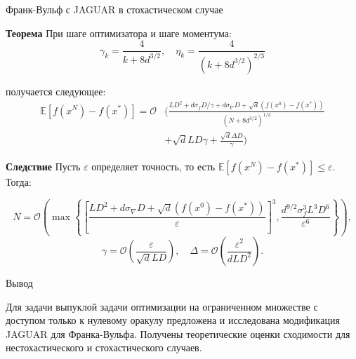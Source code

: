 \documentclass{beamer}
\newcommand{\expect}[1]{\mathbb{E}\left[ #1 \right]}
\begin{document}
\begin{frame}{Франк-Вульф с JAGUAR в стохастическом случае}

    \textbf{Теорема} При шаге оптимизатора и шаге моментума:
        $$\gamma_k = \frac{4}{k + 8d^{3/2}}, \quad \eta_k = \frac{4}{(k + 8d^{3/2})^{2/3}}$$
            
        получается следующее:
        \small{
            \begin{equation*}
                \begin{split}
                    \expect{f(x^{N}) - f(x^*)} = \mathcal{O}
                    &\Bigg(
                    \frac{L D^2 + d \sigma_f D/ \gamma + d \sigma_{\nabla} D + \sqrt{d} (f(x^0) - f(x^*))}{(N + 8d^{3/2})^{1/3}} 
                    \\&+
                    \sqrt{d} L D \gamma + \frac{\sqrt{d} \Delta D}{\gamma} \Bigg)
                \end{split}
            \end{equation*}
        }

            \textbf{Следствие} Пусть $\varepsilon$ определяет точность, то есть $\expect{f(x^N) - f(x^*)} \leq \varepsilon$. Тогда:

        \small{
            \begin{equation*}
                N = \mathcal{O} \left( \max\left\{ \left[ \frac{L D^2 + d\sigma_{\nabla} D + \sqrt{d} (f(x^0) - f(x^*))}{\varepsilon}\right]^3 , \frac{d^{9/2} \sigma_f^3 L^3D^6}{\varepsilon^6} \right\}\right),
            \end{equation*}
        }
        \small{
            \begin{equation*}
                \gamma = \mathcal{O} \left(\frac{\varepsilon}{\sqrt{d} L D} \right), \quad
                \Delta = \mathcal{O} \left( \frac{\varepsilon^2}{d L D^2}\right).
            \end{equation*}
        }
            
\end{frame}


\begin{frame}{Вывод}

    Для задачи выпуклой задачи оптимизации на ограниченном множестве с доступом только к нулевому оракулу предложена и исследована модификация JAGUAR для Франка-Вульфа. Получены теоретические оценки сходимости для нестохастического и стохастического случаев.
    
\end{frame}
\end{document}
